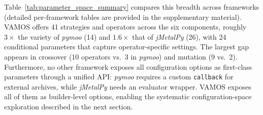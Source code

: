 \documentclass[final,5p,times,twocolumn]{elsarticle}
\newcommand{\VAMOS}{VAMOS}
\begin{document}
Table~\ref{tab:parameter_space_summary} compares this breadth across frameworks (detailed per-framework tables are provided in the supplementary material). \VAMOS{} offers 41 strategies and operators across the six components, roughly $3\times$ the variety of \textit{pymoo} (14) and $1.6\times$ that of \textit{jMetalPy} (26), with 24 conditional parameters that capture operator-specific settings. The largest gap appears in crossover (10 operators vs.\ 3 in \textit{pymoo}) and mutation (9 vs.\ 2). Furthermore, no other framework exposes all configuration options as first-class parameters through a unified API: \textit{pymoo} requires a custom \texttt{callback} for external archives, while \textit{jMetalPy} needs an evaluator wrapper. \VAMOS{} exposes all of them as builder-level options, enabling the systematic configuration-space exploration described in the next section.
\end{document}
